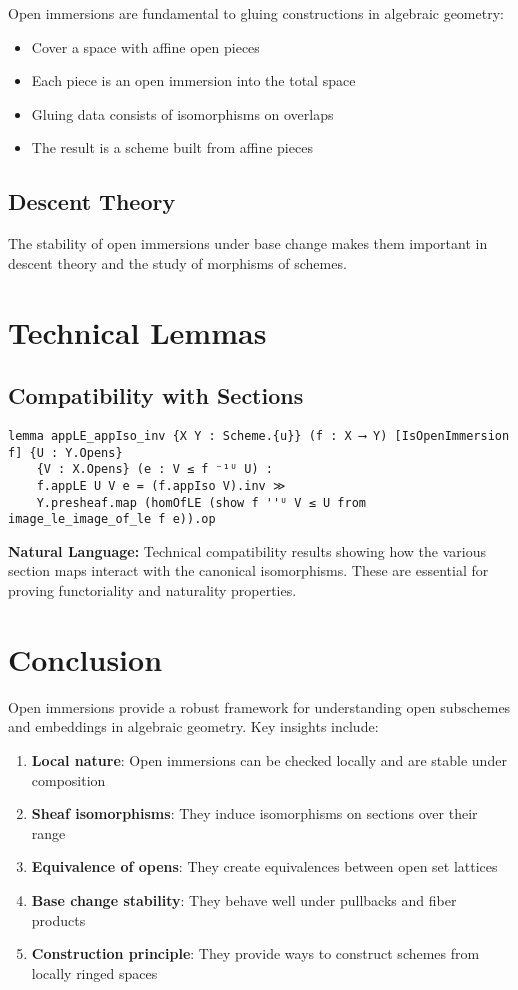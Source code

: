 \documentclass{article}
\theoremstyle{definition}
\begin{document}
Open immersions are fundamental to gluing constructions in algebraic geometry:
\begin{itemize}
\item Cover a space with affine open pieces
\item Each piece is an open immersion into the total space
\item Gluing data consists of isomorphisms on overlaps
\item The result is a scheme built from affine pieces
\end{itemize}

\subsection{Descent Theory}

The stability of open immersions under base change makes them important in descent theory and the study of morphisms of schemes.

\section{Technical Lemmas}

\subsection{Compatibility with Sections}

\begin{lstlisting}
lemma appLE_appIso_inv {X Y : Scheme.{u}} (f : X ⟶ Y) [IsOpenImmersion f] {U : Y.Opens}
    {V : X.Opens} (e : V ≤ f ⁻¹ᵁ U) :
    f.appLE U V e = (f.appIso V).inv ≫ 
    Y.presheaf.map (homOfLE (show f ''ᵁ V ≤ U from image_le_image_of_le f e)).op
\end{lstlisting}

\textbf{Natural Language:} Technical compatibility results showing how the various section maps interact with the canonical isomorphisms. These are essential for proving functoriality and naturality properties.

\section{Conclusion}

Open immersions provide a robust framework for understanding open subschemes and embeddings in algebraic geometry. Key insights include:

\begin{enumerate}
\item \textbf{Local nature}: Open immersions can be checked locally and are stable under composition
\item \textbf{Sheaf isomorphisms}: They induce isomorphisms on sections over their range
\item \textbf{Equivalence of opens}: They create equivalences between open set lattices  
\item \textbf{Base change stability}: They behave well under pullbacks and fiber products
\item \textbf{Construction principle}: They provide ways to construct schemes from locally ringed spaces
\end{enumerate}
\end{document}
